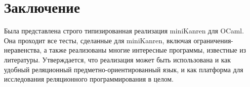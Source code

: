 

\section{Заключение}

Была представлена строго типизированная реализация miniKanren для OCaml.
Она проходит все тесты, сделанные для miniKanren, включая ограничения-неравенства, а также реализованы многие интересные программы, известные из литературы.
Утверждается, что реализация может быть использована и как удобный реляционный предметно-ориентированный язык, и как платформа для исследования реляционного программирования в целом.

